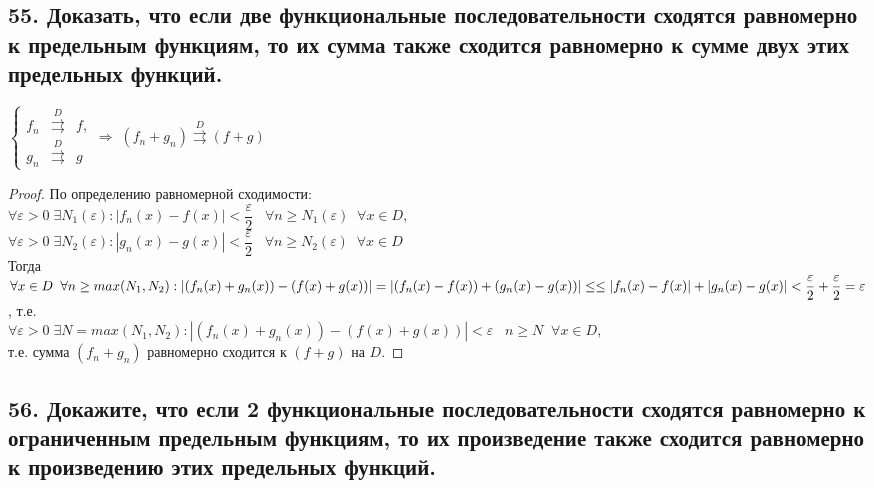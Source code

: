 \documentclass[a4paper, fleqn]{article}
\begin{document}
    \subsection*{55. Доказать, что если две функциональные последовательности сходятся равномерно к предельным функциям, 
    то их сумма также сходится равномерно к сумме двух этих предельных функций.}
	$\left\{\begin{array}{lll} 
	f_n &\overset{D}{\rightrightarrows}& f, \\[5 pt]
	g_n &\overset{D}{\rightrightarrows}& g
	\end{array}\right. \Rightarrow \; (f_n + g_n) \overset{D}{\rightrightarrows} (f + g)$
	\begin{proof}
	По определению равномерной сходимости: \\[3 pt]
	$\forall \varepsilon > 0 \; \exists N_1(\varepsilon) : |f_n(x) - f(x)| < \dfrac{\varepsilon}2 \;\;\; \forall n \ge N_1(\varepsilon)\;\; \forall x \in D$, \\[3 pt]
	$\forall \varepsilon > 0 \; \exists N_2(\varepsilon) : |g_n(x) - g(x)| < \dfrac{\varepsilon}2 \;\;\; \forall n \ge N_2(\varepsilon)\;\; \forall x \in D$ \\[3 pt]
	Тогда \\[3 pt]
	$\forall x \in D \;\; \forall n \ge max(N_1, N_2) : |(f_n(x) + g_n(x)) - (f(x) + g(x))|  = |(f_n(x) - f(x)) + (g_n(x) - g(x))|  \le \\[3 pt]
	\le |f_n(x) - f(x)| + |g_n(x) - g(x)| < \dfrac{\varepsilon}2 + \dfrac{\varepsilon}2 = \varepsilon$, т.е. \\[3 pt]
	$\forall \varepsilon > 0 \; \exists N = max(N_1, N_2) : |(f_n(x) + g_n(x)) - (f(x) + g(x))| < \varepsilon \;\;\; n \ge N \;\; \forall x \in D$, \\[5 pt]
	т.е. сумма $(f_n + g_n)$ равномерно сходится к $(f + g)$ на $D$.
	\end{proof}    
    
    \subsection*{56. Докажите, что если 2 функциональные последовательности сходятся равномерно к ограниченным предельным функциям, то их произведение также сходится равномерно к произведению этих предельных функций.}
        
\end{document}
